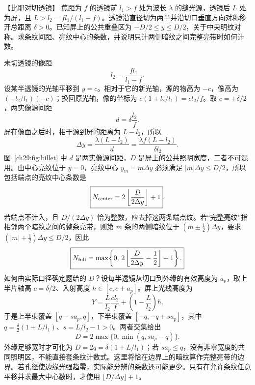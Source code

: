 \begin{origexamplebox}{【比耶对切透镜】}\label{ch29:ex:s44-21-8}
焦距为 $f$ 的透镜前 $l_1>f$ 处为波长 $\lambda$ 的缝光源，透镜后 $L$ 处为屏，且 $L>l_2=fl_1/(l_1-f)$。透镜沿直径切为两半并沿切口垂直方向对称移开总距离 $\delta>0$。已知屏上的公共重叠区为 $-D/2\le y\le D/2$，关于中央明纹对称。求条纹间距、亮纹中心的条数，并说明只计两侧暗纹之间完整亮带时如何计数。

\begin{center}\begin{minipage}{.96\linewidth}\centering
{}
\end{minipage}\end{center}
\end{origexamplebox}\par\nopagebreak[3]
\begin{xesolution}
\BilletSourceDiagram
未切透镜的像距
\[
 l_2=\frac{fl_1}{l_1-f}.
\]
设某半透镜的光轴平移到 $y=c$。相对于它的新光轴，源的物高为 $-c$，像高为 $(-l_2/l_1)(-c)$；换回原光轴，像的坐标为 $c(1+l_2/l_1)=cl_2/f$。取 $c=\pm\delta/2$，两实像源间距
\[
 d=\delta\frac{l_2}{f}.
\]
屏在像面之后时，相干源到屏的距离为 $L-l_2$，所以
\[
 \boxed{\Delta y=\frac{\lambda(L-l_2)}d
 =\frac{\lambda f(L-l_2)}{\delta l_2}}.
\]
图~\ref{ch29:fig:billet} 中 $d$ 是两实像源间距，$D$ 是屏上的公共照明宽度，二者不可混用。由中心亮纹位于 $y=0$，亮纹中心 $y_m=m\Delta y$ 必须满足 $|m|\Delta y\le D/2$，所以包括端点的亮纹中心条数是
\[
 \boxed{N_{\rm center}=2\left\lfloor\frac{D}{2\Delta y}\right\rfloor+1}.
\]
若端点不计入，且 $D/(2\Delta y)$ 恰为整数，应去掉这两条端点纹。若“完整亮纹”指相邻两个暗纹之间的整条亮带，则第 $m$ 条的两侧暗纹位于 $(m\pm\tfrac12)\Delta y$，要求 $(|m|+\tfrac12)\Delta y\le D/2$，因此
\[
 \boxed{N_{\rm full}=\max\!\left\{0,\,
 2\left\lfloor\frac{D}{2\Delta y}-\frac12\right\rfloor+1\right\}.}
\]
如何由实际口径确定题给的 $D$？设每半透镜从切口到外缘的有效高度为 $a_p$，取上半片轴高 $c=\delta/2$、入射高度 $h\in[c,c+a_p]$。屏上光线高度为
\[
 Y=\frac{L}{l_2}\frac{cl_2}{f}+\left(1-\frac{L}{l_2}\right)h.
\]
于是上半束覆盖 $[q-sa_p,q]$，下半束覆盖 $[-q,-q+sa_p]$，其中
$q=\frac\delta2(1+L/l_1)$、$s=L/l_2-1>0$。两者交集给出
\[
 \boxed{D=2\max\{0,\min(q,sa_p-q)\}.}
\]
外缘足够宽时才可化为 $D=2q=\delta(1+L/l_1)$；若 $sa_p\le q$，没有非零宽度的共同照明区，不能直接套条纹计数式。这里将恰在边界上的暗纹算作完整亮带的边界。若孔径使边缘光强趋零，实际能分辨的条数还可能更少。只有在允许条纹任意平移并求最大中心数时，才使用 $\lfloor D/\Delta y\rfloor+1$。
\end{xesolution}

